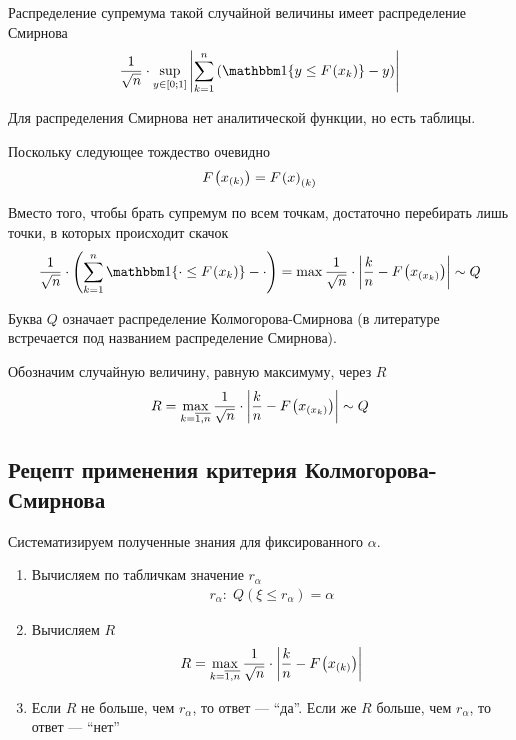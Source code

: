 Распределение супремума такой случайной величины имеет распределение Смирнова
\begin{align*}
  \frac{1}{\sqrt{n}} \cdot \sup\limits_{y \in \left[ 0; 1 \right]}
      {\left| \sum_{k=1}^{n} \left( \Indicator{y \le \cdf{x_k}} - y  \right)
      \right|}
\end{align*}

Для распределения Смирнова нет аналитической функции, но есть таблицы.

Поскольку следующее тождество очевидно
\begin{align*}
  F_{}\left(x_{\left( k \right)}\right) = F_{}\left(x\right)_{\left( k \right)}
\end{align*}

Вместо того, чтобы брать супремум по всем точкам, достаточно перебирать лишь
точки, в которых происходит скачок
\begin{align*}
  \frac{1}{\sqrt{n}} \cdot \left(
      \sum_{k=1}^{n}\Indicator{\cdot \le \cdf{x_k}} - \cdot \right)
  = \max{\frac{1}{\sqrt{n}} \cdot \left| \frac{k}{n}
      - \cdf{x_{\left( x_k \right)}} \right|}
  \sim Q
\end{align*}

Буква $Q$ означает распределение Колмогорова-Смирнова (в литературе встречается
под названием распределение Смирнова).

Обозначим случайную величину, равную максимуму, через $R$
\begin{align*}
  R = \max\limits_{k= \overline{1,n}}{
      \frac{1}{\sqrt{n}} \cdot \left| \frac{k}{n}
      - F_{}\left(x_{\left( x_k \right)}\right) \right|}
  \sim Q
\end{align*}

\subsection{Рецепт применения критерия Колмогорова-Смирнова}

Систематизируем полученные знания для фиксированного $\alpha$.

\begin{enumerate}
  \item Вычисляем по табличкам значение $r_{\alpha}$
      \begin{align*}
      r_{\alpha}:\; Q\left( \xi \le r_{\alpha} \right) = \alpha
      \end{align*}
  \item Вычисляем $R$
      \begin{align*}
      R = \max\limits_{k= \overline{1,n}}{
          \frac{1}{\sqrt{n}} \cdot \left| \frac{k}{n}
        - F_{}\left(x_{\left( k \right)}\right) \right|}
      \end{align*}
  \item Если $R$ не больше, чем $r_{\alpha}$, то ответ --- ``да''.
      Если же $R$ больше, чем $r_{\alpha}$, то ответ --- ``нет''
\end{enumerate}

